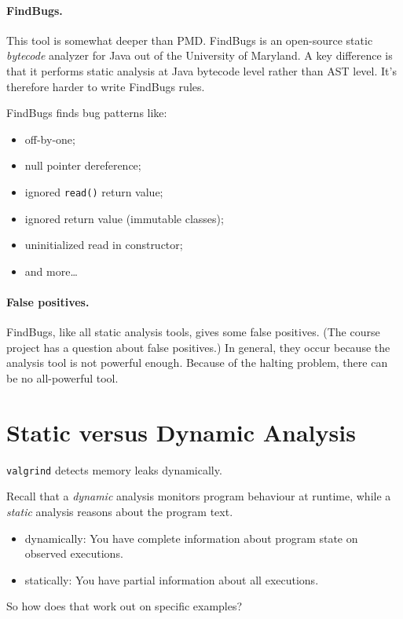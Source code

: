 \documentclass[11pt]{article}
\begin{document}
{\paragraph{FindBugs.} This tool is somewhat deeper than PMD. FindBugs is an 
open-source static \emph{bytecode} analyzer for Java out of the
University of Maryland.  A key difference is that it performs static
analysis at Java bytecode level rather than AST level. It's therefore
harder to write FindBugs rules.

FindBugs finds bug patterns like:
\begin{itemize}[noitemsep]
    \item off-by-one;
    \item null pointer dereference;
    \item ignored {\tt read()} return value;
    \item ignored return value (immutable classes);
    \item uninitialized read in constructor;
    \item and more\ldots
\end{itemize}

\paragraph{False positives.}
FindBugs, like all static analysis tools, gives some false positives.
(The course project has a question about false positives.) In general, they
occur because the analysis tool is not powerful enough. Because of the
halting problem, there can be no all-powerful tool.

\section*{Static versus Dynamic Analysis}
{\tt valgrind} detects memory leaks dynamically.

Recall that a \emph{dynamic} analysis monitors program behaviour at runtime,
while a \emph{static} analysis reasons about the program text.

\begin{itemize}[noitemsep]
\item dynamically: You have complete information about program state on observed executions.
\item statically: You have partial information about all executions.
\end{itemize}

So how does that work out on specific examples?

}
\end{document}
